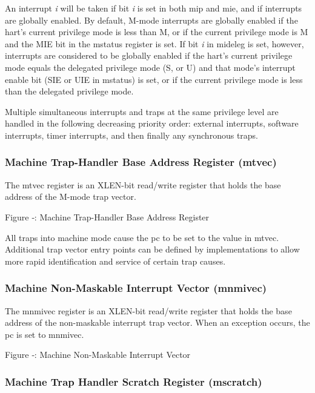 An interrupt \emph{i} will be taken if bit \emph{i} is set in both mip
and mie, and if interrupts are globally enabled. By default, M-mode
interrupts are globally enabled if the hart's current privilege mode is
less than M, or if the current privilege mode is M and the MIE bit in
the mstatus register is set. If bit \emph{i} in mideleg is set, however,
interrupts are considered to be globally enabled if the hart's current
privilege mode equals the delegated privilege mode (S, or U) and that
mode's interrupt enable bit (SIE or UIE in mstatus) is set, or if the
current privilege mode is less than the delegated privilege mode.

Multiple simultaneous interrupts and traps at the same privilege level
are handled in the following decreasing priority order: external
interrupts, software interrupts, timer interrupts, and then finally any
synchronous traps.

\subsubsection{Machine Trap-Handler Base Address Register
(mtvec)}\label{machine-trap-handler-base-address-register-mtvec}

The mtvec register is an XLEN-bit read/write register that holds the
base address of the M-mode trap vector.

\missingfigure{}

Figure ‑: Machine Trap-Handler Base Address Register

All traps into machine mode cause the pc to be set to the value in
mtvec. Additional trap vector entry points can be defined by
implementations to allow more rapid identification and service of
certain trap causes.

\subsubsection{Machine Non-Maskable Interrupt Vector
(mnmivec)}\label{machine-non-maskable-interrupt-vector-mnmivec}

The mnmivec register is an XLEN-bit read/write register that holds the
base address of the non-maskable interrupt trap vector. When an
exception occurs, the pc is set to mnmivec.

\missingfigure{}

Figure ‑: Machine Non-Maskable Interrupt Vector

\subsubsection{Machine Trap Handler Scratch Register
(mscratch)}\label{machine-trap-handler-scratch-register-mscratch}

